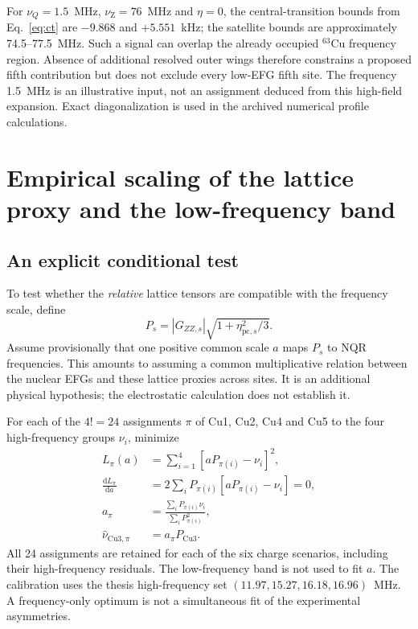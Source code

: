 \documentclass[11pt,a4paper]{article}
\newcommand{\dd}{\mathrm d}
\newcommand{\nuq}{\nu_Q}
\newcommand{\nuz}{\nu_{\mathrm Z}}
\begin{document}
For $\nuq=1.5$~MHz, $\nuz=76$~MHz and $\eta=0$, the central-transition bounds
from Eq.~\eqref{eq:ct} are $-9.868$ and $+5.551$~kHz; the satellite bounds are
approximately 74.5--77.5~MHz. Such a signal can overlap the already occupied
$^{63}$Cu frequency region. Absence of additional resolved outer wings therefore
constrains a proposed fifth contribution but does not exclude every low-EFG
fifth site. The frequency 1.5~MHz is an illustrative input, not an assignment
deduced from this high-field expansion. Exact diagonalization is used in the
archived numerical profile calculations.

\section{Empirical scaling of the lattice proxy and the low-frequency band}

\subsection{An explicit conditional test}

To test whether the \emph{relative} lattice tensors are compatible with the
frequency scale, define
\begin{equation}
 P_s=|G_{ZZ,s}|\sqrt{1+\eta_{\mathrm{pc},s}^2/3}.
\end{equation}
Assume provisionally that one positive common scale $a$ maps $P_s$ to NQR
frequencies. This amounts to assuming a common multiplicative relation between
the nuclear EFGs and these lattice proxies across sites. It is an additional
physical hypothesis; the electrostatic calculation does not establish it.

For each of the $4!=24$ assignments $\pi$ of Cu1, Cu2, Cu4 and Cu5 to the four
high-frequency groups $\nu_i$, minimize
\begin{align}
 L_\pi(a)&=\sum_{i=1}^4[aP_{\pi(i)}-\nu_i]^2,\\
 \frac{\dd L_\pi}{\dd a}
 &=2\sum_iP_{\pi(i)}[aP_{\pi(i)}-\nu_i]=0,\\
 a_\pi&=\frac{\sum_iP_{\pi(i)}\nu_i}
 {\sum_iP_{\pi(i)}^2},\\
 \widehat\nu_{\mathrm{Cu3},\pi}&=a_\pi P_{\mathrm{Cu3}}.
\label{eq:calibration}
\end{align}
All 24 assignments are retained for each of the six charge scenarios, including
their high-frequency residuals. The low-frequency band is not used to fit $a$.
The calibration uses the thesis high-frequency set
$(11.97,15.27,16.18,16.96)$~MHz. A frequency-only optimum is not a simultaneous
fit of the experimental asymmetries.
\end{document}
